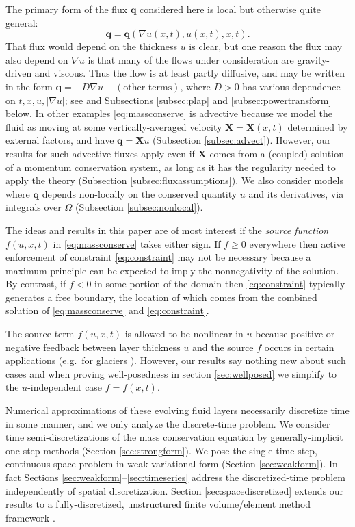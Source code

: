 \documentclass[final,leqno,onefignum,onetabnum]{siamltex1213bueler}
\newcommand\bq{\mathbf{q}}
\newcommand\bX{\mathbf{X}}
\renewcommand{\grad}{\nabla}
\begin{document}
The primary form of the flux $\bq$ considered here is local but otherwise quite general:
\begin{equation}
\bq = \bq(\grad u(x,t),u(x,t),x,t). \label{eq:fluxdepends}
\end{equation}
That flux would depend on the thickness $u$ is clear, but one reason the flux may also depend on $\grad u$ is that many of the flows under consideration are gravity-driven and viscous.  Thus the flow is at least partly diffusive, and may be written in the form $\bq=- D \grad u + (\text{other terms})$, where $D > 0$ has various dependence on $t,x,u,|\grad u|$; see \cite{Ockendonetal2003} and Subsections \ref{subsec:plap} and \ref{subsec:powertransform} below.  In other examples \eqref{eq:massconserve} is advective because we model the fluid as moving at some vertically-averaged velocity $\bX=\bX(x,t)$ determined by external factors, and have $\bq = \bX u$ (Subsection \ref{subsec:advect}).  However, our results for such advective fluxes apply even if $\bX$ comes from a (coupled) solution of a momentum conservation system, as long as it has the regularity needed to apply the theory (Subsection \ref{subsec:fluxassumptions}).  We also consider models where $\bq$ depends non-locally on the conserved quantity $u$ and its derivatives, via integrals over $\Omega$ (Subsection \ref{subsec:nonlocal}).

The ideas and results in this paper are of most interest if the \emph{source function} $f(u,x,t)$ in \eqref{eq:massconserve} takes either sign.  If $f\ge 0$ everywhere then active enforcement of constraint \eqref{eq:constraint} may not be necessary because a maximum principle can be expected to imply the nonnegativity of the solution.  By contrast, if $f<0$ in some portion of the domain then \eqref{eq:constraint} typically generates a free boundary, the location of which comes from the combined solution of \eqref{eq:massconserve} and \eqref{eq:constraint}.

The source term $f(u,x,t)$ is allowed to be nonlinear in $u$ because positive or negative feedback between layer thickness $u$ and the source $f$ occurs in certain applications (e.g.~for glaciers \cite{Jouvetetal2011}).  However, our results say nothing new about such cases and when proving well-posedness in section \ref{sec:wellposed} we simplify to the $u$-independent case $f=f(x,t)$.

Numerical approximations of these evolving fluid layers necessarily discretize time in some manner, and we only analyze the discrete-time problem.  We consider time semi-discretizations of the mass conservation equation by generally-implicit one-step methods (Section \ref{sec:strongform}).  We pose the single-time-step, continuous-space problem in weak variational form (Section \ref{sec:weakform}).  In fact Sections \ref{sec:weakform}--\ref{sec:timeseries} address the discretized-time problem independently of spatial discretization.  Section \ref{sec:spacediscretized} extends our results to a fully-discretized, unstructured finite volume/element method framework \cite{Cai1990}.
\end{document}

